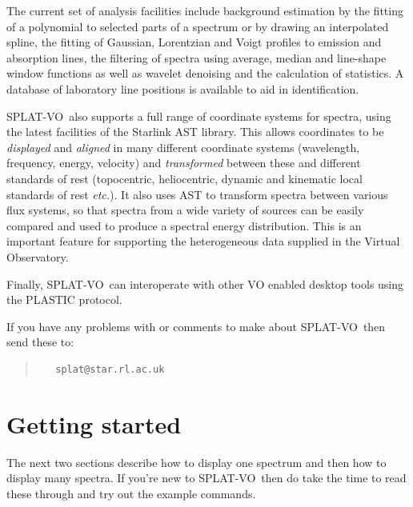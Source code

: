 \documentclass[twoside,11pt]{article}
\newcommand{\xref}[3]{#1}
\newcommand{\xlabel}[1]{}
\renewcommand{\_}{\texttt{\symbol{95}}}
\newcommand{\SPLAT}{\textsf{SPLAT-VO}}
\newcommand{\etc}{\textit{etc.}}
\begin{document}
The current set of analysis facilities include background estimation by the
fitting of a polynomial to selected parts of a spectrum or by drawing an
interpolated spline, the fitting of Gaussian, Lorentzian and Voigt profiles to
emission and absorption lines, the filtering of spectra using average,
median and line-shape window functions as well as wavelet denoising and
the calculation of statistics.
A database of laboratory line positions is available to aid in identification.

\SPLAT\ also supports a full range of coordinate systems for spectra,
using the latest facilities of the Starlink \xref{AST}{sun211}{}
library.
This allows coordinates to be \textit{displayed} and \textit{aligned}
in many different coordinate systems (wavelength, frequency, energy,
velocity) and \textit{transformed} between these and different
standards of rest (topocentric, heliocentric, dynamic and kinematic
local standards of rest \etc).
It also uses AST to transform spectra between various flux systems, so that
spectra from a wide variety of sources can be easily compared and used to
produce a spectral energy distribution.
This is an important feature for supporting the heterogeneous data supplied
in the Virtual Observatory.

Finally, \SPLAT\ can interoperate with other VO enabled desktop tools using
the PLASTIC protocol.


If you have any problems with or comments to make about \SPLAT\, then send
these to:
\begin{quote}
\begin{verbatim}
   splat@star.rl.ac.uk
\end{verbatim}
\end{quote}


\section{Getting started\xlabel{getting_started}}

The next two sections describe how to display one spectrum and then
how to display many spectra. If you're new to \SPLAT\ then do take the
time to read these through and try out the example commands.
\end{document}
